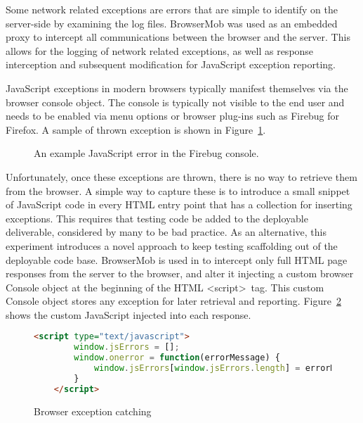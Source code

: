 Some network related exceptions are errors that are simple to identify on the server-side by examining the log files.  BrowserMob was used as an embedded proxy to intercept all communications between the browser and the server.  This allows for the logging of network related exceptions, as well as response interception and subsequent modification for JavaScript exception reporting.

JavaScript exceptions in modern browsers typically manifest themselves via the browser console object.  The console is typically not visible to the end user and needs to be enabled via menu options or browser plug-ins such as Firebug for Firefox.  A sample of thrown exception is shown in Figure~\ref{fig:consoleError}.

\begin{figure}[H]
\caption{An example JavaScript error in the Firebug console.}
\label{fig:consoleError}
\end{figure}

Unfortunately, once these exceptions are thrown, there is no way to retrieve them from the browser.  A simple way to capture these is to introduce a small snippet of JavaScript code in every HTML entry point that has a collection for inserting exceptions.  This requires that testing code be added to the deployable deliverable, considered by many to be bad practice.  As an alternative, this experiment introduces a novel approach to keep testing scaffolding out of the deployable code base.  BrowserMob is used in to intercept only full HTML page responses from the server to the browser, and alter it injecting a custom browser Console object at the beginning of the HTML \textless script\textgreater\  tag.  This custom Console object stores any exception for later retrieval and reporting.  Figure~\ref{consoleJavascript} shows the custom JavaScript injected into each response.

\begin{figure}
\begin{lstlisting}[language=HTML]
	<script type="text/javascript">
		window.jsErrors = [];
		window.onerror = function(errorMessage) {
			window.jsErrors[window.jsErrors.length] = errorMessage;
		}
	</script>
\end{lstlisting}
\caption{Browser exception catching}
\label{consoleJavascript}
\end{figure}

